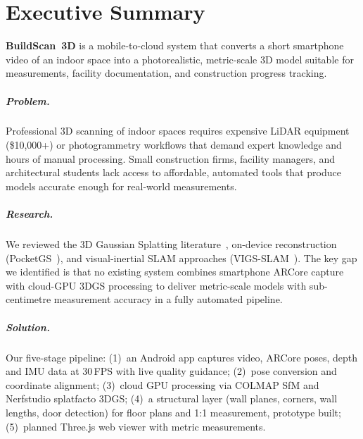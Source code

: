 \chapter*{Executive Summary}

\textbf{BuildScan~3D} is a mobile-to-cloud system that converts a short smartphone video of an indoor space into a photorealistic, metric-scale 3D model suitable for measurements, facility documentation, and construction progress tracking.

\paragraph{Problem.} Professional 3D scanning of indoor spaces requires expensive LiDAR equipment (\$10{,}000+) or photogrammetry workflows that demand expert knowledge and hours of manual processing. Small construction firms, facility managers, and architectural students lack access to affordable, automated tools that produce models accurate enough for real-world measurements.

\paragraph{Research.} We reviewed the 3D Gaussian Splatting literature~\cite{kerbl3dgs}, on-device reconstruction (PocketGS~\cite{pocketgs}), and visual-inertial SLAM approaches (VIGS-SLAM~\cite{vigsslam}). The key gap we identified is that no existing system combines smartphone ARCore capture with cloud-GPU 3DGS processing to deliver metric-scale models with sub-centimetre measurement accuracy in a fully automated pipeline.

\paragraph{Solution.} Our five-stage pipeline: (1)~an Android app captures video, ARCore poses, depth and IMU data at 30\,FPS with live quality guidance; (2)~pose conversion and coordinate alignment; (3)~cloud GPU processing via COLMAP SfM and Nerfstudio splatfacto 3DGS; (4)~a structural layer (wall planes, corners, wall lengths, door detection) for floor plans and 1:1 measurement, prototype built; (5)~planned Three.js web viewer with metric measurements.

